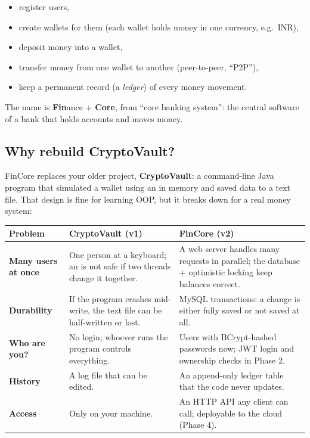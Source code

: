 \documentclass[11pt,a4paper]{article}
\newcommand{\code}[1]{\texttt{\detokenize{#1}}}
\begin{document}
\begin{itemize}
  \item register users,
  \item create wallets for them (each wallet holds money in one currency, e.g.\ INR),
  \item deposit money into a wallet,
  \item transfer money from one wallet to another (peer-to-peer, ``P2P''),
  \item keep a permanent record (a \emph{ledger}) of every money movement.
\end{itemize}

The name is \textbf{Fin}ance + \textbf{Core}, from ``core banking system'': the central
software of a bank that holds accounts and moves money.

\subsection{Why rebuild CryptoVault?}
FinCore replaces your older project, \textbf{CryptoVault}: a command-line Java program that
simulated a wallet using an \code{ArrayList} in memory and saved data to a text file.
That design is fine for learning OOP, but it breaks down for a real money system:

\begin{center}
\begin{tabularx}{\textwidth}{>{\bfseries}l X X}
\toprule
Problem & CryptoVault (v1) & FinCore (v2) \\
\midrule
Many users at once & One person at a keyboard; an \code{ArrayList} is not safe if two threads change it together. & A web server handles many requests in parallel; the database + optimistic locking keep balances correct. \\
Durability & If the program crashes mid-write, the text file can be half-written or lost. & MySQL transactions: a change is either fully saved or not saved at all. \\
Who are you? & No login; whoever runs the program controls everything. & Users with BCrypt-hashed passwords now; JWT login and ownership checks in Phase 2. \\
History & A log file that can be edited. & An append-only ledger table that the code never updates. \\
Access & Only on your machine. & An HTTP API any client can call; deployable to the cloud (Phase 4). \\
\bottomrule
\end{tabularx}
\end{center}
\end{document}
